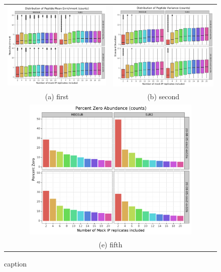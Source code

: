 \documentclass{article}
\newcommand{\beginsupplement}{%
        \setcounter{table}{0}
        \renewcommand{\thetable}{S\arabic{table}}%
        \setcounter{figure}{0}
        \renewcommand{\thefigure}{S\arabic{figure}}%
     }
\begin{document}
\begin{figure}
\centering
\begin{tabular}{cc}
  \includegraphics[width=65mm]{figures/42_mockip_abundance_variance/counts/mean_limit_y.pdf} &   \includegraphics[width=65mm]{figures/42_mockip_abundance_variance/counts/std_limit_y.pdf} \\
(a) first & (b) second \\[6pt]
\multicolumn{2}{c}{\includegraphics[width=85mm]{figures/42_mockip_abundance_variance/counts/per-zero.pdf} }\\
\multicolumn{2}{c}{(e) fifth}
\end{tabular}
\caption{caption}
\end{figure}

\end{document}
